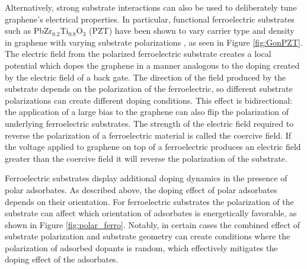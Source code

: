 \documentclass[edeposit,fullpage,draftthesis]{uiucthesis2009}
\begin{document}
        Alternatively, strong substrate interactions can also be used to deliberately tune graphene's 
        electrical properties. In particular, functional ferroelectric substrates such as 
        PbZr$_{0.2}$Ti$_{0.8}$O$_3$ (PZT) have been shown to vary carrier type and density in 
        graphene with varying substrate polarizations \cite{Baeumer2013}, as seen in Figure 
        \ref{fig:GonPZT}. The electric field from the polarized ferroelectric substrate creates a local potential
        which dopes the graphene in a manner analogous to the doping created by the electric field of a back gate.
        The direction of the field produced by the substrate depends on the polarization of the ferroelectric,
        so different substrate polarizations can create different doping conditions.
        This effect is bidirectional: the application of a large bias to the graphene 
        can also flip the polarization of underlying ferroelectric substrates. The strength of the 
        electric field required to reverse the polarization of a ferroelectric material is called
        the coercive field. If the voltage applied to graphene on top of a ferroelectric produces
        an electric field greater than the coercive field it will reverse the polarization of the substrate.
        
        Ferroelectric substrates display additional doping dynamics in the presence of polar adsorbates.
        As described above, the doping effect of polar adsorbates depends on their orientation. 
        For ferroelectric substrates the polarization of the substrate can affect which orientation
        of adsorbates is energetically favorable, as shown in Figure \ref{fig:polar_ferro}. Notably,
        in certain cases the combined effect of substrate polarization and substrate geometry can
        create conditions where the polarization of adsorbed dopants is random, which effectively 
        mitigates the doping effect of the adsorbates.
         
\end{document}
